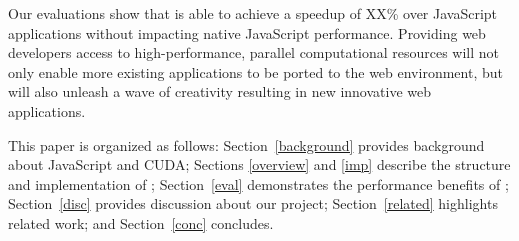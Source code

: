 Our evaluations show that \name is able to achieve a speedup of XX\% over
JavaScript applications without impacting native JavaScript performance.
Providing web developers access to high-performance, parallel computational
resources will not only enable more existing applications to be ported to the
web environment, but will also unleash a wave of creativity resulting in new
innovative web applications.

This paper is organized as follows: Section~\ref{background} provides background
about JavaScript and CUDA; Sections \ref{overview} and \ref{imp} describe the
structure and implementation of \namens; Section~\ref{eval} demonstrates the
performance benefits of \namens; Section~\ref{disc} provides discussion
about our project; Section~\ref{related} highlights related work; and
Section~\ref{conc} concludes.

